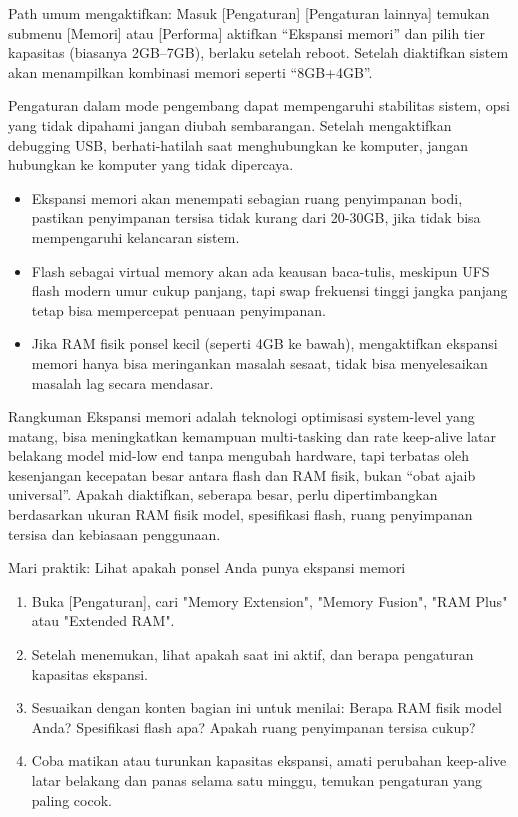 Path umum mengaktifkan: Masuk [Pengaturan] [Pengaturan lainnya] temukan submenu [Memori] atau [Performa] aktifkan “Ekspansi memori” dan pilih tier kapasitas (biasanya 2GB–7GB), berlaku setelah reboot. Setelah diaktifkan sistem akan menampilkan kombinasi memori seperti “8GB+4GB”.

\begin{tcbwarn}{Pengaturan dalam mode pengembang dapat mempengaruhi stabilitas sistem, opsi yang tidak dipahami jangan diubah sembarangan. Setelah mengaktifkan debugging USB, berhati-hatilah saat menghubungkan ke komputer, jangan hubungkan ke komputer yang tidak dipercaya.}
\begin{itemize}
  \item Ekspansi memori akan menempati sebagian ruang penyimpanan bodi, pastikan penyimpanan tersisa tidak kurang dari 20-30GB, jika tidak bisa mempengaruhi kelancaran sistem.
  \item Flash sebagai virtual memory akan ada keausan baca-tulis, meskipun UFS flash modern umur cukup panjang, tapi swap frekuensi tinggi jangka panjang tetap bisa mempercepat penuaan penyimpanan.
  \item Jika RAM fisik ponsel kecil (seperti 4GB ke bawah), mengaktifkan ekspansi memori hanya bisa meringankan masalah sesaat, tidak bisa menyelesaikan masalah lag secara mendasar.
\end{itemize}

\end{tcbwarn}

\begin{tcbinfo}{Rangkuman}
Ekspansi memori adalah teknologi optimisasi system-level yang matang, bisa meningkatkan kemampuan multi-tasking dan rate keep-alive latar belakang model mid-low end tanpa mengubah hardware, tapi terbatas oleh kesenjangan kecepatan besar antara flash dan RAM fisik, bukan “obat ajaib universal”. Apakah diaktifkan, seberapa besar, perlu dipertimbangkan berdasarkan ukuran RAM fisik model, spesifikasi flash, ruang penyimpanan tersisa dan kebiasaan penggunaan.

\end{tcbinfo}

\begin{tcbpractice}{Mari praktik: Lihat apakah ponsel Anda punya ekspansi memori}
\begin{enumerate}
  \item Buka [Pengaturan], cari "Memory Extension", "Memory Fusion", "RAM Plus" atau "Extended RAM".
  \item Setelah menemukan, lihat apakah saat ini aktif, dan berapa pengaturan kapasitas ekspansi.
  \item Sesuaikan dengan konten bagian ini untuk menilai: Berapa RAM fisik model Anda? Spesifikasi flash apa? Apakah ruang penyimpanan tersisa cukup?
  \item Coba matikan atau turunkan kapasitas ekspansi, amati perubahan keep-alive latar belakang dan panas selama satu minggu, temukan pengaturan yang paling cocok.
\end{enumerate}

\end{tcbpractice}
